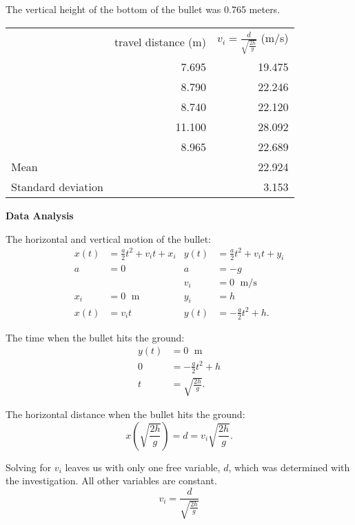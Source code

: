 \documentclass[12pt]{article}
\newcommand{\paren}[1]{\left({#1}\right)}
\newcommand{\double}[0]{\par\null\par}
\DeclareMathOperator{\m}{\ m}
\DeclareMathOperator{\ms}{\ m/s}
\DeclareMathOperator{\mssq}{\ m/s^2}
\newcommand{\header}[1]{\large\textbf{#1}\normalsize}
\begin{document}
The vertical height of the bottom of the bullet was 0.765 meters.

\begin{center}
\begin{tabular}{lr|r}
& travel distance (m) & $v_i=\frac{d}{\sqrt{\frac{2h}{g}}}$ (m/s) \\
\cline{2-3}
& 7.695 & 19.475 \\
& 8.790 & 22.246 \\
& 8.740 & 22.120 \\
& 11.100 & 28.092 \\
& 8.965  & 22.689 \\
\hline
Mean & & 22.924 \\
Standard deviation & & 3.153 \\
\end{tabular}
\end{center}

\double\header{Data Analysis}

The horizontal and vertical motion of the bullet:
\begin{align*}
x\paren{t}&=\frac{a}{2}t^2+v_i{t}+x_i   & y\paren{t}&=\frac{a}{2}t^2+v_i{t}+y_i \\
a&=0\mssq                               & a&=-g \\
&                                       & v_i&=0\ms \\
x_i&=0\m                                & y_i&=h \\
x\paren{t}&=v_i{t}                      & y\paren{t}&=-\frac{g}{2}t^2+h.
\end{align*}

The time when the bullet hits the ground:
\begin{align*}
y\paren{t}&=0\m \\
0&=-\frac{g}{2}t^2+h \\
t&=\sqrt{\frac{2h}{g}}.
\end{align*}

The horizontal distance when the bullet hits the ground:
\begin{equation*}
x\paren{\sqrt{\frac{2h}{g}}}=d=v_i\sqrt{\frac{2h}{g}}.
\end{equation*}

Solving for $v_i$ leaves us with only one free variable, $d$, which was determined with the investigation. All other variables are
constant.
\begin{equation*}
v_i=\frac{d}{\sqrt{\frac{2h}{g}}}
\end{equation*}
\end{document}
